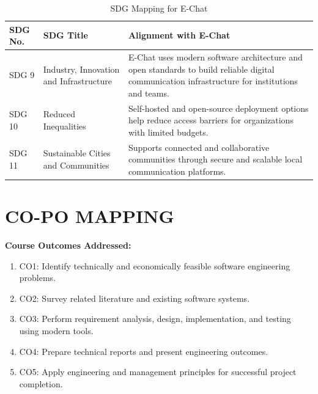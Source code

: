\documentclass[12pt,a4paper,oneside]{report}
\begin{document}
\begin{table}[H]
\centering
\caption{SDG Mapping for E-Chat}
\begin{tabularx}{\textwidth}{|C{1.8cm}|C{4.1cm}|X|}
\hline
\textbf{SDG No.} & \textbf{SDG Title} & \textbf{Alignment with E-Chat} \\
\hline
SDG 9 & Industry, Innovation and Infrastructure & E-Chat uses modern software architecture and open standards to build reliable digital communication infrastructure for institutions and teams. \\
\hline
SDG 10 & Reduced Inequalities & Self-hosted and open-source deployment options help reduce access barriers for organizations with limited budgets. \\
\hline
SDG 11 & Sustainable Cities and Communities & Supports connected and collaborative communities through secure and scalable local communication platforms. \\
\hline
\end{tabularx}
\end{table}

\cleardoublepage

\chapter*{CO-PO MAPPING}
{}
\label{front:copo}
\thispagestyle{plain}

\textbf{Course Outcomes Addressed:}
\begin{enumerate}[leftmargin=1.2cm]
  \item CO1: Identify technically and economically feasible software engineering problems.
  \item CO2: Survey related literature and existing software systems.
  \item CO3: Perform requirement analysis, design, implementation, and testing using modern tools.
  \item CO4: Prepare technical reports and present engineering outcomes.
  \item CO5: Apply engineering and management principles for successful project completion.
\end{enumerate}
\end{document}
